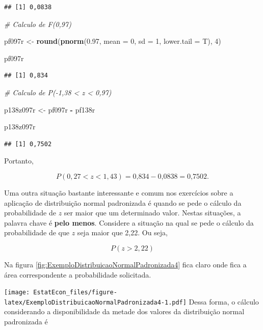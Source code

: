 \documentclass[
]{book}
\newenvironment{Shaded}{\begin{snugshade}}{\end{snugshade}}
\newcommand{\CommentTok}[1]{\textcolor[rgb]{0.56,0.35,0.01}{\textit{#1}}}
\newcommand{\DataTypeTok}[1]{\textcolor[rgb]{0.13,0.29,0.53}{#1}}
\newcommand{\DecValTok}[1]{\textcolor[rgb]{0.00,0.00,0.81}{#1}}
\newcommand{\FloatTok}[1]{\textcolor[rgb]{0.00,0.00,0.81}{#1}}
\newcommand{\KeywordTok}[1]{\textcolor[rgb]{0.13,0.29,0.53}{\textbf{#1}}}
\newcommand{\NormalTok}[1]{#1}
\newcommand{\OperatorTok}[1]{\textcolor[rgb]{0.81,0.36,0.00}{\textbf{#1}}}
\newcommand{\StringTok}[1]{\textcolor[rgb]{0.31,0.60,0.02}{#1}}
\begin{document}
\begin{verbatim}
## [1] 0,0838
\end{verbatim}

\begin{Shaded}
\begin{Highlighting}[]
\CommentTok{# Calculo de F(0,97)}

\NormalTok{pf097r <-}\StringTok{ }\KeywordTok{round}\NormalTok{(}\KeywordTok{pnorm}\NormalTok{(}\FloatTok{0.97}\NormalTok{, }\DataTypeTok{mean =} \DecValTok{0}\NormalTok{, }\DataTypeTok{sd =} \DecValTok{1}\NormalTok{, }\DataTypeTok{lower.tail =}\NormalTok{ T), }
    \DecValTok{4}\NormalTok{)}

\NormalTok{pf097r}
\end{Highlighting}
\end{Shaded}

\begin{verbatim}
## [1] 0,834
\end{verbatim}

\begin{Shaded}
\begin{Highlighting}[]
\CommentTok{# Calculo de P(-1,38 < z < 0,97)}

\NormalTok{p138z097r <-}\StringTok{ }\NormalTok{pf097r }\OperatorTok{-}\StringTok{ }\NormalTok{pf138r}


\NormalTok{p138z097r}
\end{Highlighting}
\end{Shaded}

\begin{verbatim}
## [1] 0,7502
\end{verbatim}

Portanto,

\[
  P(0,27 < z < 1,43) = \text{0,834} - \text{0,0838} = \text{0,7502}.
\]

Uma outra situação bastante interessante e comum nos exercícios sobre a aplicação de distribuição normal padronizada é quando se pede o cálculo da probabilidade de \(z\) ser maior que um determinado valor. Nestas situações, a palavra chave é \textbf{pelo menos}. Considere a situação na qual se pede o cálculo da probabilidade de que \(z\) seja maior que 2,22. Ou seja,

\[
P(z > 2,22)
\]

Na figura \ref{fig:ExemploDistribuicaoNormalPadronizada4} fica claro onde fica a área correspondente a probabilidade solicitada.

\texttt{[image: EstatEcon\_files/figure-latex/ExemploDistribuicaoNormalPadronizada4-1.pdf]}
Dessa forma, o cálculo considerando a disponibilidade da metade dos valores da distribuição normal padronizada é
\end{document}
